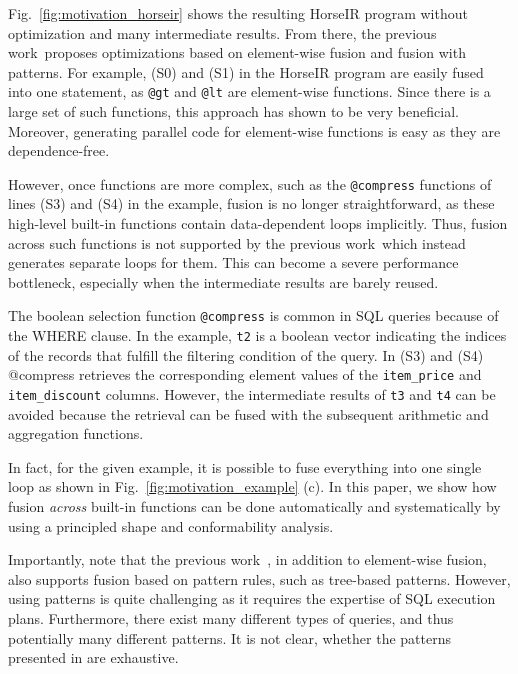 Fig.~\ref{fig:motivation_horseir} shows the resulting HorseIR program without
optimization and many intermediate results. From there, the previous
work~\OldPaper proposes optimizations based on element-wise fusion and fusion
with patterns. For example, (S0) and (S1) in the HorseIR program are easily
fused into one statement, as \texttt{@gt} and \texttt{@lt} are element-wise
functions. Since there is a large set of such functions, this approach has
shown to be very beneficial. 
Moreover, generating parallel code for element-wise functions is easy as they
are dependence-free.


However, once functions are more complex, such as the \texttt{@compress}
functions of lines (S3) and (S4) in the example, fusion is no longer
straightforward, as these high-level built-in functions contain data-dependent
loops implicitly. 
Thus, fusion across such functions is not supported by the previous
work~\OldPaper which instead generates separate loops for them.
This can become a severe performance bottleneck, especially when the
intermediate results are barely reused. 

The boolean selection function \texttt{@compress} is common in SQL queries
because of the WHERE clause.
In the example, \texttt{t2} is a boolean vector indicating the indices of the
records that fulfill the filtering condition of the query. In (S3) and (S4)
@compress retrieves the corresponding element values of the
\texttt{item\_price} and \texttt{item\_discount} columns.
However, the intermediate results of \texttt{t3} and \texttt{t4} can be avoided
because the retrieval can be fused with the subsequent arithmetic and
aggregation functions. 

In fact, for the given example, it is possible to fuse everything into one
single loop as shown in Fig.~\ref{fig:motivation_example} (c).
In this paper, we show how fusion \textit{across} built-in functions can be
done automatically and systematically by using a principled shape and
conformability analysis. 

Importantly, note that the previous work~\OldPaper, in addition to element-wise
fusion, also supports fusion based on pattern rules, such as tree-based patterns.
However, using patterns is quite challenging as it requires the expertise of
SQL execution plans. Furthermore, there exist many different types of queries,
and thus potentially many different patterns. It is not clear, whether the
patterns presented in \OldPaper are exhaustive. 


